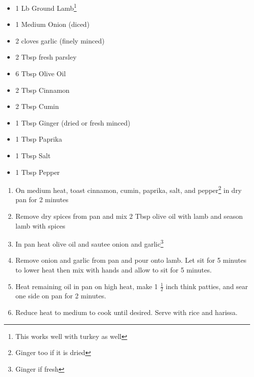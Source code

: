 \documentclass[oneside]{recipe}
\newcommand{\recipecolumn}[2]{
	\begin{multicols}{2}
	\raggedcolumns
	#1
	\columnbreak
	#2
	\end{multicols}
}
\begin{document}
\recipecolumn{
	\begin{itemize}	
		\item 1 Lb Ground Lamb\footnote{This works well with turkey as well}
		\item 1 Medium Onion (diced)
		\item 2 cloves garlic (finely minced)
		\item 2 Tbsp fresh parsley
		\item 6 Tbsp Olive Oil
		\item 2 Tbsp Cinnamon
		\item 2 Tbsp Cumin
		\item 1 Tbsp Ginger (dried or fresh minced)
		\item 1 Tbsp Paprika
		\item 1 Tbsp Salt
		\item 1 Tbsp Pepper
	\end{itemize}
}{
	\begin{enumerate}
		\item On medium heat, toast cinnamon, cumin, paprika, salt, and pepper\footnote{Ginger too if it is dried} in dry pan for 2 minutes
		\item Remove dry spices from pan and mix 2 Tbsp olive oil with lamb and season lamb with spices 
		\item In pan heat olive oil and sautee onion and garlic\footnote{Ginger if fresh} 
		\item Remove onion and garlic from pan and pour onto lamb. Let sit for 5 minutes to lower heat then mix with hands and allow to sit for 5 minutes. 
		\item Heat remaining oil in pan on high heat,  make 1 $\frac{1}{2}$ inch think patties, and sear one side on pan for 2 minutes. 
		\item Reduce heat to medium to cook until desired. Serve with rice and harissa. 
	\end{enumerate}
}	
\end{document}
